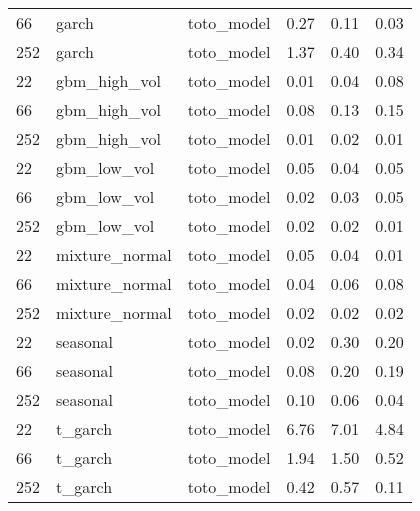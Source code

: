 {\begin{tabular}{lllrrr}
66 & garch & toto\_model & 0.27 & 0.11 & 0.03 \\
252 & garch & toto\_model & 1.37 & 0.40 & 0.34 \\
\midrule
22 & gbm\_high\_vol & toto\_model & 0.01 & 0.04 & 0.08 \\
66 & gbm\_high\_vol & toto\_model & 0.08 & 0.13 & 0.15 \\
252 & gbm\_high\_vol & toto\_model & 0.01 & 0.02 & 0.01 \\
\midrule
22 & gbm\_low\_vol & toto\_model & 0.05 & 0.04 & 0.05 \\
66 & gbm\_low\_vol & toto\_model & 0.02 & 0.03 & 0.05 \\
252 & gbm\_low\_vol & toto\_model & 0.02 & 0.02 & 0.01 \\
\midrule
22 & mixture\_normal & toto\_model & 0.05 & 0.04 & 0.01 \\
66 & mixture\_normal & toto\_model & 0.04 & 0.06 & 0.08 \\
252 & mixture\_normal & toto\_model & 0.02 & 0.02 & 0.02 \\
\midrule
22 & seasonal & toto\_model & 0.02 & 0.30 & 0.20 \\
66 & seasonal & toto\_model & 0.08 & 0.20 & 0.19 \\
252 & seasonal & toto\_model & 0.10 & 0.06 & 0.04 \\
\midrule
22 & t\_garch & toto\_model & 6.76 & 7.01 & 4.84 \\
66 & t\_garch & toto\_model & 1.94 & 1.50 & 0.52 \\
252 & t\_garch & toto\_model & 0.42 & 0.57 & 0.11 \\
\bottomrule
\end{tabular}
}